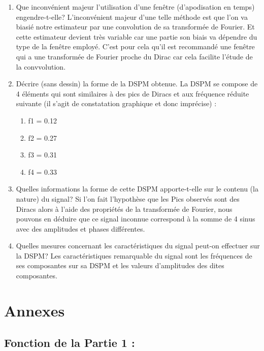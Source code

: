 \documentclass{article}
\begin{document}
\begin{enumerate}
\renewcommand{\theenumi}{\Alph{enumi}}

\item Que inconvénient majeur l'utilisation d'une fenêtre (d'apodisation en temps) engendre-t-elle?
L'inconvénient majeur d'une telle méthode est que l'on va biasié notre estimateur par une convolution de sa transformée de Fourier. Et cette estimateur devient très variable car une partie son biais va dépendre du type de la fenêtre employé. \newline
C'est pour cela qu'il est recommandé une fenêtre qui a une transformée de Fourier proche du Dirac car cela facilite l'étude de la convvolution.

\item Décrire (sans dessin) la forme de la DSPM obtenue.
La DSPM se compose de 4 éléments qui sont similaires à des pics de Diracs et  aux fréquence réduite suivante (il s'agit de constatation graphique et donc imprécise) : 
\begin{center}
\begin{enumerate}
    \item f1 = 0.12
    \item f2 = 0.27
    \item f3 = 0.31 
    \item f4 = 0.33
\end{enumerate}
\end{center}

\item Quelles informations la forme de cette DSPM apporte-t-elle sur le contenu (la nature) du signal?
\newline
Si l'on fait l'hypothèse que les Pics observés sont des Diracs alors à l'aide des propriétés de la transformée de Fourier, nous pouvons en déduire que ce signal inconnue correspond à la somme de 4 sinus avec des amplitudes et phases différentes.

\item Quelles mesures concernant  les caractéristiques du signal peut-on effectuer sur la DSPM?
Les caractéristiques remarquable du signal sont les fréquences de ses composantes sur sa DSPM et les valeurs d'amplitudes des dites composantes.
\end{enumerate}

\section{Annexes}
\subsection{Fonction de la Partie 1 : }
\end{document}
